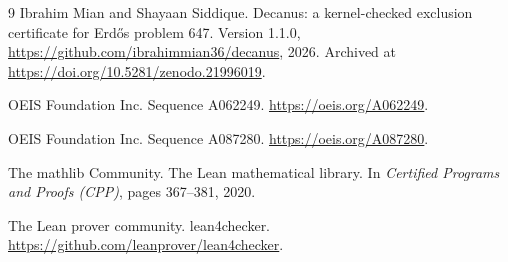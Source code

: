 \documentclass[11pt]{article}
\begin{document}
\begin{thebibliography}{9}
Ibrahim Mian and Shayaan Siddique. Decanus: a kernel-checked exclusion
certificate for Erd\H{o}s problem 647. Version 1.1.0,
\url{https://github.com/ibrahimmian36/decanus}, 2026. Archived at
\url{https://doi.org/10.5281/zenodo.21996019}.

OEIS Foundation Inc. Sequence A062249. \url{https://oeis.org/A062249}.

OEIS Foundation Inc. Sequence A087280. \url{https://oeis.org/A087280}.

The mathlib Community. The Lean mathematical library. In
\emph{Certified Programs and Proofs (CPP)}, pages 367--381, 2020.

The Lean prover community. lean4checker.
\url{https://github.com/leanprover/lean4checker}.

\end{thebibliography}
\end{document}
